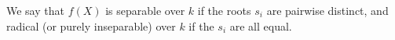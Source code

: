 We say that $f(X)$ is separable over $k$ if the roots $s_i$ are pairwise distinct, and radical (or purely inseparable) over $k$ if the $s_i$ are all equal.
